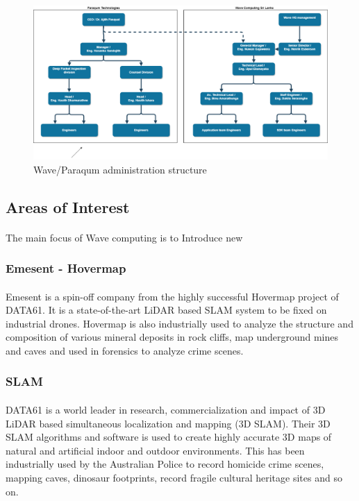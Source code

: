 \begin{figure}[h]
    \centering
    \includegraphics[trim=0cm 0cm 0cm 0cm, clip=true,scale=0.25]{figures/admin_struct.png}
    \caption{Wave/Paraqum administration structure \label{Fig:adminstruct}}\vspace{-4mm}
    \end{figure}

\subsection{Areas of Interest}

\paragraph{}
The main focus of Wave computing is to Introduce new 

\subsubsection*{Emesent - Hovermap}
\paragraph{}
Emesent is a spin-off company from the highly successful Hovermap project of DATA61. It is a state-of-the-art LiDAR based SLAM system to be fixed on industrial drones. Hovermap is also industrially used to analyze the structure and composition of various mineral deposits in rock cliffs, map underground mines and caves and used in forensics to analyze crime scenes.

\subsubsection*{SLAM}
\paragraph{}
DATA61 is a world leader in research, commercialization and impact of 3D LiDAR based simultaneous localization and mapping (3D SLAM). Their 3D SLAM algorithms and software is used to create highly accurate 3D maps of natural and artificial indoor and outdoor environments. This has been industrially used by the Australian Police to record homicide crime scenes, mapping caves, dinosaur footprints, record fragile cultural heritage sites and so on.

